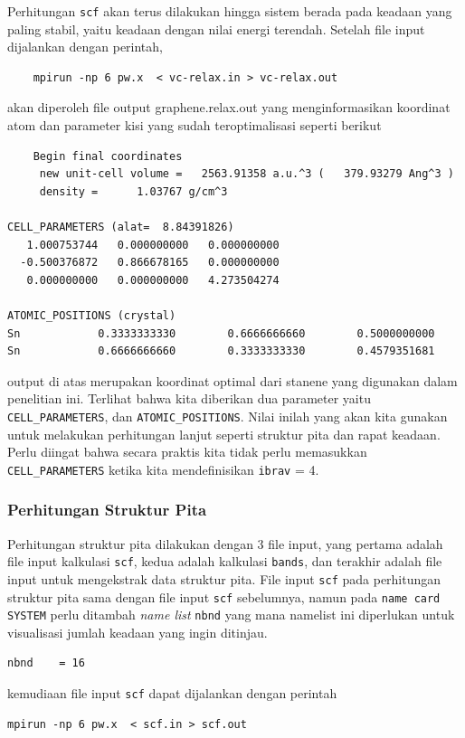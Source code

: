 Perhitungan \texttt{scf} akan terus dilakukan hingga sistem berada pada keadaan yang paling stabil, yaitu keadaan dengan nilai energi terendah. Setelah file input dijalankan dengan perintah,
\begin{lstlisting}
    mpirun -np 6 pw.x  < vc-relax.in > vc-relax.out
\end{lstlisting}
akan diperoleh file output graphene.relax.out yang menginformasikan koordinat atom dan parameter kisi yang sudah teroptimalisasi seperti berikut

\begin{lstlisting}
    Begin final coordinates
     new unit-cell volume =   2563.91358 a.u.^3 (   379.93279 Ang^3 )
     density =      1.03767 g/cm^3

CELL_PARAMETERS (alat=  8.84391826)
   1.000753744   0.000000000   0.000000000
  -0.500376872   0.866678165   0.000000000
   0.000000000   0.000000000   4.273504274

ATOMIC_POSITIONS (crystal)
Sn            0.3333333330        0.6666666660        0.5000000000    
Sn            0.6666666660        0.3333333330        0.4579351681
\end{lstlisting}
output di atas merupakan koordinat optimal dari stanene yang digunakan dalam penelitian ini. Terlihat bahwa kita diberikan dua parameter yaitu \texttt{CELL\_PARAMETERS}, dan \texttt{ATOMIC\_POSITIONS}. Nilai inilah yang akan kita gunakan untuk melakukan perhitungan lanjut seperti struktur pita dan rapat keadaan. Perlu diingat bahwa secara praktis kita tidak perlu memasukkan \texttt{CELL\_PARAMETERS} ketika kita mendefinisikan \texttt{ibrav} = 4.

\subsubsection{Perhitungan Struktur Pita}
Perhitungan struktur pita dilakukan dengan 3 file input, yang pertama adalah file input kalkulasi \texttt{scf}, kedua adalah kalkulasi \texttt{bands}, dan terakhir adalah file input untuk mengekstrak data struktur pita. File input \texttt{scf} pada perhitungan struktur pita sama dengan file input \texttt{scf} sebelumnya, namun pada \texttt{name card} \texttt{SYSTEM} perlu ditambah \textit{name list} \texttt{nbnd} yang mana namelist ini diperlukan untuk visualisasi jumlah keadaan yang ingin ditinjau.
\begin{lstlisting}
nbnd    = 16
\end{lstlisting}
kemudiaan file input \texttt{scf} dapat dijalankan dengan perintah
\begin{lstlisting}
mpirun -np 6 pw.x  < scf.in > scf.out
\end{lstlisting}

